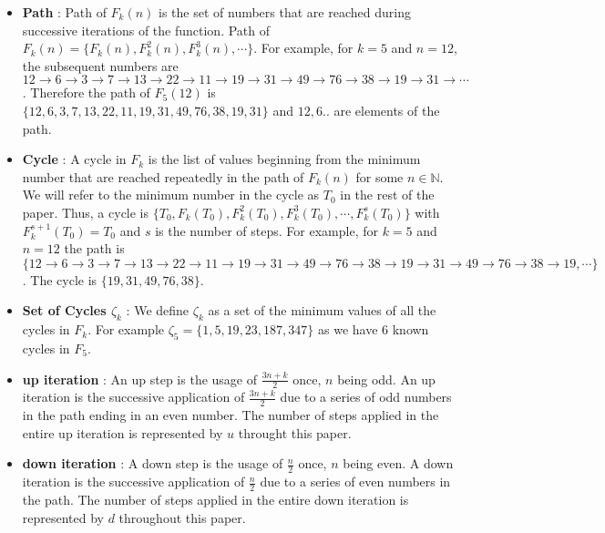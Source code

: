 \documentclass[12pt]{article} %
\begin{document}
\begin{itemize}
    \item \textbf{Path} : Path of $F_k(n)$ is the set of numbers that are reached during successive iterations of the function. Path of $F_k(n) = \{F_k(n), F_k^2(n), F_k^3(n), \cdots \}$. For example, for $k=5$ and $n=12$, the subsequent numbers are $12 \rightarrow  6 \rightarrow  3\rightarrow 7 \rightarrow  13\rightarrow 22 \rightarrow  11\rightarrow 19\rightarrow 31\rightarrow  49\rightarrow 76 \rightarrow 38\rightarrow 19 \rightarrow  31\rightarrow \cdots$. Therefore the path of $F_5(12)$ is $\{12, 6, 3, 7, 13, 22, 11, 19, 31, 49, 76, 38, 19, 31\}$ and $12, 6 ..$ are elements of the path.
    
    \item \textbf{Cycle} : A cycle in $F_k$ is the list of values beginning from the minimum number that are reached repeatedly in the path of $F_k(n)$ for some $n \in \mathbb{N}$. We will refer to the minimum number in the cycle as $T_0$ in the rest of the paper. Thus, a cycle is $\{T_0, F_k(T_0), F^2_k(T_0), F^3_k(T_0), \cdots , F^s_k(T_0)\}$ with $F^{s+1}_k(T_0) = T_0$ and $s$ is the number of steps. For example, for $k=5$ and $n=12$ the path is $\{12 \rightarrow  6 \rightarrow  3\rightarrow 7 \rightarrow  13\rightarrow 22 \rightarrow  11\rightarrow 19\rightarrow 31\rightarrow  49\rightarrow 76 \rightarrow  38\rightarrow 19 \rightarrow  31\rightarrow 49 \rightarrow 76\rightarrow 38\rightarrow 19, \cdots\}$.  The cycle is $\{19, 31, 49, 76, 38\}$.
      
      \item \textbf{Set of Cycles $\zeta_k$} : We define $\zeta_k$ as a set of the minimum values of all the cycles in $F_k$. For example $\zeta_5 = \{ 1, 5, 19, 23, 187, 347\}$ as we have $6$ known cycles in $F_5$.
      
      \item \textbf{up iteration} : An up step is the usage of $\frac{3n+k}{2}$ once, $n$ being odd. An up iteration is the successive application of $\frac{3n+k}{2}$ due to a series of odd numbers in the path ending in an even number. The number of steps applied in the entire up iteration is represented by $u$ throught this paper.
      
      \item \textbf{down iteration} : A down step is the usage of $\frac{n}{2}$ once, $n$ being even. A down iteration is the successive application of $\frac{n}{2}$ due to a series of even numbers in the path. The number of steps applied in the entire down iteration is represented by $d$ throughout this paper.
      

\end{itemize}
\end{document}
